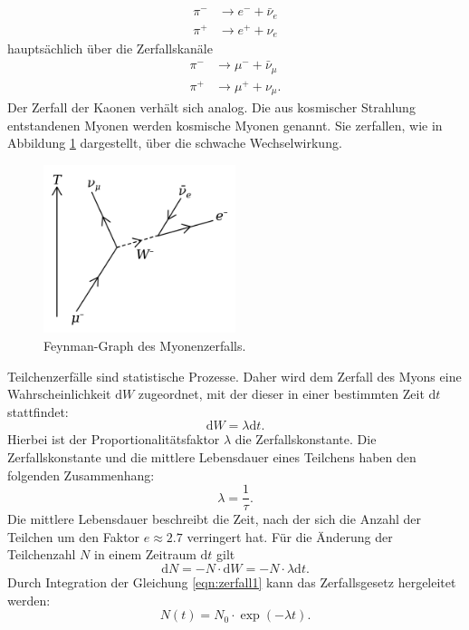 \begin{align*}
  \pi^{-} & \rightarrow e^{-} + \bar{\nu}_{e} \\
  \pi^{+} & \rightarrow e^{+} + \nu_{e}
\end{align*}
\noindent
hauptsächlich über die Zerfallskanäle
\begin{align*}
\pi^{-} & \rightarrow \mu^{-} + \bar{\nu}_{\mu} \\
\pi^{+} & \rightarrow \mu^{+} + \nu_{\mu}.
\end{align*}
\noindent
Der Zerfall der Kaonen verhält sich analog. Die aus kosmischer Strahlung entstandenen
Myonen werden kosmische Myonen genannt.
Sie zerfallen, wie in Abbildung \ref{zerfall} dargestellt, über die schwache Wechselwirkung.
\begin{figure}[H]
  \centering
  \includegraphics[width=0.5\textwidth]{pictures/Muon_Decay.png}
  \caption{Feynman-Graph des Myonenzerfalls.\cite{Myon-Wikipedia}}
  \label{zerfall}
\end{figure}
\noindent
Teilchenzerfälle sind statistische Prozesse. Daher wird dem Zerfall des Myons
eine Wahrscheinlichkeit $\text{d}W$  zugeordnet, mit der dieser in einer bestimmten Zeit $\text{d}t$
stattfindet:
\begin{equation*}
  \text{d}W = \lambda \text{d}t.
\end{equation*}
\noindent
Hierbei ist der Proportionalitätsfaktor $\lambda$ die Zerfallskonstante.
Die Zerfallskonstante und die mittlere Lebensdauer eines Teilchens haben den folgenden
Zusammenhang:
\begin{equation*}
  \lambda = \frac{1}{\tau}.
\end{equation*}
\noindent
Die mittlere Lebensdauer beschreibt die Zeit, nach der sich die Anzahl der Teilchen um
den Faktor $e \approx 2.7$ verringert hat.
Für die Änderung der Teilchenzahl $N$ in einem Zeitraum $\text{d}t$ gilt
\begin{equation}
  \text{d}N = - N \cdot \text{d}W = - N \cdot \lambda \text{d}t.
  \label{eqn:zerfall1}
\end{equation}
\noindent
Durch Integration der Gleichung \ref{eqn:zerfall1} kann das Zerfallsgesetz hergeleitet werden:
\begin{equation}
  N(t) = N_{0} \cdot \exp{(-\lambda t)}.
  \label{eqn:zerfallsgesetz}
\end{equation}
\noindent
